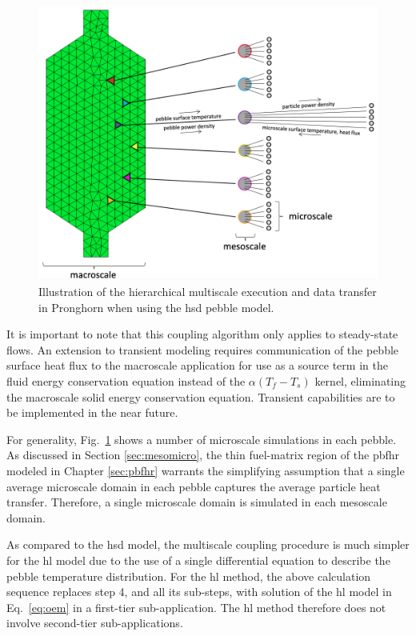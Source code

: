 \begin{figure}[!h]
\centering
\includegraphics[width=0.8\linewidth]{figs/multiscale_pbr_d.png}
\caption{Illustration of the hierarchical multiscale execution and data transfer in Pronghorn when using the \gls{hsd} pebble model.}
\label{fig:multiscale_pbr}
\end{figure}

It is important to note that this coupling algorithm only applies to steady-state flows. An extension to transient modeling requires communication of the pebble surface heat flux to the macroscale application for use as a source term in the fluid energy conservation equation instead of the \(\alpha(T_f-T_s)\) kernel, eliminating the macroscale solid energy conservation equation. Transient capabilities are to be implemented in the near future. 

For generality, Fig.\ \ref{fig:multiscale_pbr} shows a number of microscale simulations in each pebble. As discussed in Section \ref{sec:mesomicro}, the thin fuel-matrix region of the \gls{pbfhr} modeled in Chapter \ref{sec:pbfhr} warrants the simplifying assumption that a single average microscale domain in each pebble captures the average particle heat transfer. Therefore, a single microscale domain is simulated in each mesoscale domain.

As compared to the \gls{hsd} model, the multiscale coupling procedure is much simpler for the \gls{hl} model due to the use of a single differential equation to describe the pebble temperature distribution. For the \gls{hl} method, the above calculation sequence replaces step 4, and all its sub-steps, with solution of the \gls{hl} model in Eq.\ \eqref{eq:oem} in a first-tier sub-application. The \gls{hl} method therefore does not involve second-tier sub-applications. 

